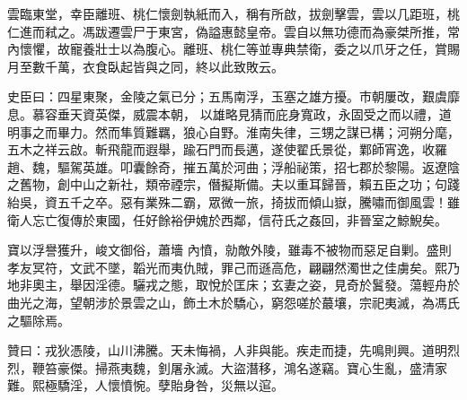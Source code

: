 \begin{pinyinscope}
 雲臨東堂，幸臣離班、桃仁懷劍執紙而入，稱有所啟，拔劍擊雲，雲以几距班，桃仁進而弒之。馮跋遷雲尸于東宮，偽謚惠懿皇帝。雲自以無功德而為豪桀所推，常內懷懼，故寵養壯士以為腹心。離班、桃仁等並專典禁衛，委之以爪牙之任，賞賜月至數千萬，衣食臥起皆與之同，終以此致敗云。



 史臣曰：四星東聚，金陵之氣已分；五馬南浮，玉塞之雄方擾。市朝屢改，艱虞靡息。慕容垂天資英傑，威震本朝，
 以雄略見猜而庇身寬政，永固受之而以禮，道明事之而畢力。然而隼質難羈，狼心自野。淮南失律，三甥之謀已構；河朔分麾，五木之祥云啟。斬飛龍而遐舉，踰石門而長邁，遂使翟氏景從，鄴師宵逸，收羅趙、魏，驅駕英雄。叩囊餘奇，摧五萬於河曲；浮船祕策，招七郡於黎陽。返遼陰之舊物，創中山之新社，類帝禋宗，僭擬斯備。夫以重耳歸晉，賴五臣之功；句踐紿吳，資五千之卒。惡有業殊二霸，眾微一旅，掎拔而傾山嶽，騰嘯而御風雲！雖衛人忘亡復傳於東國，任好餘裕伊媿於西鄰，信苻氏之姦回，非晉室之鯨鯢矣。



 寶以浮譽獲升，峻文御俗，蕭墻
 內憤，勍敵外陵，雖毒不被物而惡足自剿。盛則孝友冥符，文武不墜，韜光而夷仇賊，罪己而遜高危，翩翩然濁世之佳虜矣。熙乃地非奧主，舉因淫德。驪戎之態，取悅於匡床；玄妻之姿，見奇於鬒發。蕩輕舟於曲光之海，望朝涉於景雲之山，飾土木於驕心，窮怨嗟於蕞壤，宗祀夷滅，為馮氏之驅除焉。



 贊曰：戎狄憑陵，山川沸騰。天未悔禍，人非與能。疾走而捷，先鳴則興。道明烈烈，鞭笞豪傑。掃燕夷魏，釗屠永滅。大盜潛移，鴻名遂竊。寶心生亂，盛清家難。熙極驕淫，人懷憤惋。孽貽身咎，災無以逭。



\end{pinyinscope}